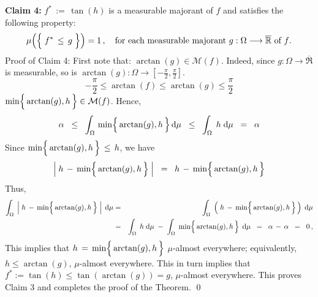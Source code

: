 \vskip 0.8cm
\noindent
\textbf{Claim 4:}\quad
$f^{*} \, := \, \tan(h)$ is a measurable majorant of $f$ and satisfies the following property:
\begin{equation*}
\mu\!\left(\left\{\;f^{*} \,\overset{{\color{white}.}}{\leq}\, g \;\right\}\right) =1\,,
\quad
\textnormal{for each measurable majorant $g : \Omega \longrightarrow \overline{\Re}$ of $f$}.
\end{equation*}
Proof of Claim 4:\;\;
\noindent
First note that: $\arctan(g) \in \mathcal{M}(f)$.
Indeed, since $g : \Omega \longrightarrow \overline{\Re}$ is measurable,
so is $\arctan(g) : \Omega \longrightarrow \left[-\frac{\pi}{2},\frac{\pi}{2}\right]$.
\begin{equation*}
-\dfrac{\pi}{2} \leq \arctan(f) \leq \arctan(g) \leq \dfrac{\pi}{2}
\end{equation*}
$\min\!\left\{\,\arctan(g),\overset{{\color{white}.}}{h}\,\right\} \in \mathcal{M}(f)$.
Hence,
\begin{equation*}
\alpha
\;\; \leq \;\;
	\int_{\Omega}\,\min\!\left\{\,\arctan(g),\overset{{\color{white}.}}{h}\,\right\}\d\mu
\;\; \leq \;\;
	\int_{\Omega}\;h\;\d\mu
\;\; = \;\;
	\alpha
\end{equation*}
Since $\min\!\left\{\,\arctan(g),\overset{{\color{white}.}}{h}\,\right\} \,\leq\, h$, we have
\begin{equation*}
\left\vert\; h \, - \, \min\!\left\{\,\arctan(g),\overset{{\color{white}.}}{h}\,\right\} \;\right\vert
\;\; = \;\;
	h \, - \, \min\!\left\{\,\arctan(g),\overset{{\color{white}.}}{h}\,\right\}
\end{equation*}
Thus,
\begin{eqnarray*}
\int_{\Omega}\;\left\vert\; h \, - \, \min\!\left\{\,\arctan(g),\overset{{\color{white}.}}{h}\,\right\} \;\right\vert\;\d\mu
& = &
	\int_{\Omega}\; \left(\;h \, - \, \min\!\left\{\,\arctan(g),\overset{{\color{white}.}}{h}\,\right\}\,\right)\;\d\mu
\\
& = &
	\int_{\Omega}\; h \;\d\mu
	\; - \;
	\int_{\Omega}\; \min\!\left\{\,\arctan(g),\overset{{\color{white}.}}{h}\,\right\}\;\d\mu
\;\; = \;\;
	\alpha \, - \, \alpha
\;\; = \;\;
	0\,,
\end{eqnarray*}
This implies that $h \, = \, \min\!\left\{\,\arctan(g),\overset{{\color{white}.}}{h}\,\right\}$
$\mu$-almost everywhere;
equivalently, $h \leq \arctan(g)$, $\mu$-almost everywhere.
This in turn implies that
$f^{*} := \tan(h) \leq \tan\!\left(\arctan(g)\right) = g$, $\mu$-almost everywhere.
This proves Claim 3 and completes the proof of the Theorem.
\qed



\renewcommand{\theenumi}{\roman{enumi}}
\renewcommand{\labelenumi}{\textnormal{(\theenumi)}$\;\;$}

